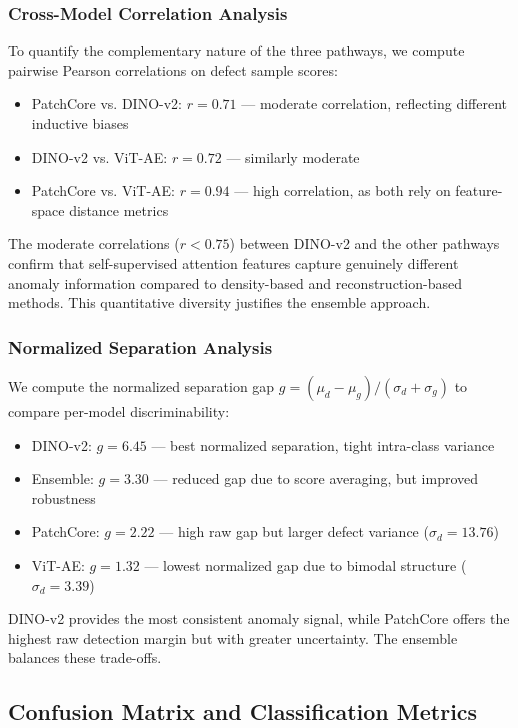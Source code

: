 \documentclass[journal]{IEEEtran}
\begin{document}
\subsubsection{Cross-Model Correlation Analysis}

To quantify the complementary nature of the three pathways, we compute pairwise Pearson correlations on defect sample scores:
\begin{itemize}[nosep]
    \item PatchCore vs. DINO-v2: $r = 0.71$ --- moderate correlation, reflecting different inductive biases
    \item DINO-v2 vs. ViT-AE: $r = 0.72$ --- similarly moderate
    \item PatchCore vs. ViT-AE: $r = 0.94$ --- high correlation, as both rely on feature-space distance metrics
\end{itemize}
The moderate correlations ($r < 0.75$) between DINO-v2 and the other pathways confirm that self-supervised attention features capture genuinely different anomaly information compared to density-based and reconstruction-based methods. This quantitative diversity justifies the ensemble approach.

\subsubsection{Normalized Separation Analysis}

We compute the normalized separation gap $g = (\mu_d - \mu_g) / (\sigma_d + \sigma_g)$ to compare per-model discriminability:
\begin{itemize}[nosep]
    \item DINO-v2: $g = 6.45$ --- best normalized separation, tight intra-class variance
    \item Ensemble: $g = 3.30$ --- reduced gap due to score averaging, but improved robustness
    \item PatchCore: $g = 2.22$ --- high raw gap but larger defect variance ($\sigma_d = 13.76$)
    \item ViT-AE: $g = 1.32$ --- lowest normalized gap due to bimodal structure ($\sigma_d = 3.39$)
\end{itemize}
DINO-v2 provides the most consistent anomaly signal, while PatchCore offers the highest raw detection margin but with greater uncertainty. The ensemble balances these trade-offs.

\subsection{Confusion Matrix and Classification Metrics}
\end{document}
